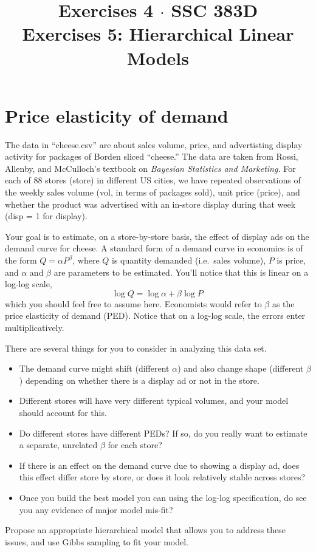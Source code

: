 \documentclass[11pt]{article}
\title{Exercises 4 $\cdot$ SSC 383D \\ Exercises 5: Hierarchical Linear Models}
\date{}  %
\begin{document}
\maketitle%


\section{Price elasticity of demand}

The data in ``cheese.csv'' are about sales volume, price, and advertisting display activity for packages of Borden sliced ``cheese.'' The data are taken from Rossi, Allenby, and McCulloch's textbook on \textit{Bayesian Statistics and Marketing.} For each of 88 stores (store) in different US cities, we have repeated observations of the weekly sales volume (vol, in terms of packages sold), unit price (price), and whether the product was advertised with an in-store display during that week (disp = 1 for display).

Your goal is to estimate, on a store-by-store basis, the effect of display ads on the demand curve for cheese.  A standard form of a demand curve in economics is of the form $Q = \alpha P^\beta$, where $Q$ is quantity demanded (i.e.~sales volume), $P$ is price, and $\alpha$ and $\beta$ are parameters to be estimated.  You'll notice that this is linear on a log-log scale,
$$
\log Q = \log \alpha + \beta \log P \,
$$
which you should feel free to assume here.  Economists would refer to $\beta$ as the price elasticity of demand (PED).  Notice that on a log-log scale, the errors enter multiplicatively.

There are several things for you to consider in analyzing this data set.
\begin{itemize}
\item The demand curve might shift (different $\alpha$) and also change shape (different $\beta$) depending on whether there is a display ad or not in the store.
\item Different stores will have very different typical volumes, and your model should account for this.
\item Do different stores have different PEDs?  If so, do you really want to estimate a separate, unrelated $\beta$ for each store?
\item If there is an effect on the demand curve due to showing a display ad, does this effect differ store by store, or does it look relatively stable across stores?
\item Once you build the best model you can using the log-log specification, do see you any evidence of major model mis-fit?
\end{itemize}
Propose an appropriate hierarchical model that allows you to address these issues, and use Gibbs sampling to fit your model.
\end{document}
